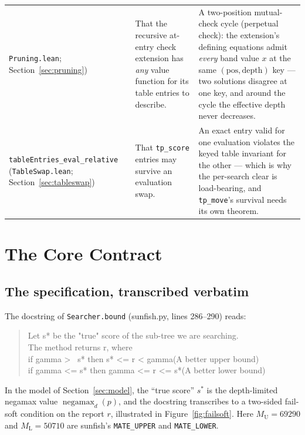 \documentclass[11pt]{article}
\DeclareMathOperator{\negamax}{negamax}
\newcommand{\MU}{M_{\mathrm{U}}}    %
\newcommand{\ML}{M_{\mathrm{L}}}    %
\theoremstyle{plain}
\theoremstyle{definition}
\theoremstyle{remark}
\begin{document}
{\begin{longtable}{@{}p{4.4cm}p{4.2cm}p{5.9cm}@{}}
\texttt{Pruning.lean}; Section~\ref{sec:pruning}) &
That the recursive at-entry check extension has \emph{any} value
function for its table entries to describe. &
A two-position mutual-check cycle (perpetual check): the extension's
defining equations admit \emph{every} band value $x$ at the same
$(\mathrm{pos},\mathrm{depth})$ key --- two solutions disagree at one
key, and around the cycle the effective depth never decreases.\\
\addlinespace
\texttt{tableEntries\_eval\_relative} \newline
(\texttt{TableSwap.lean}; Section~\ref{sec:tableswap}) &
That \texttt{tp\_score} entries may survive an evaluation swap. &
An exact entry valid for one evaluation violates the keyed table
invariant for the other --- which is why the per-search clear is
load-bearing, and \texttt{tp\_move}'s survival needs its own theorem.\\
\end{longtable}
}

\section{The Core Contract}
\label{sec:contract}

\subsection{The specification, transcribed verbatim}

The docstring of \texttt{Searcher.bound} (sunfish.py, lines 286--290)
reads:

\begin{quote}\ttfamily
Let s* be the "true" score of the sub-tree we are searching.\\
The method returns r, where\\
if gamma >~ s* then s* <= r < gamma\hspace{1em}(A better upper bound)\\
if gamma <= s* then gamma <= r <= s*\hspace{0.55em}(A better lower bound)
\end{quote}

In the model of Section~\ref{sec:model}, the ``true score'' $s^*$ is the
depth-limited negamax value $\negamax_d(p)$, and the docstring
transcribes to a two-sided fail-soft condition on the report $r$,
illustrated in Figure~\ref{fig:failsoft}.  Here $\MU = 69290$ and
$\ML = 50710$ are sunfish's \texttt{MATE\_UPPER} and
\texttt{MATE\_LOWER}.
\end{document}
